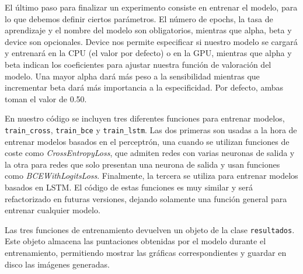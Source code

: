 
El último paso para finalizar un experimento consiste en entrenar el modelo, para lo que debemos definir ciertos parámetros. El número de epochs, la tasa de aprendizaje y el nombre del modelo son obligatorios, mientras que alpha, beta y device son opcionales. Device nos permite especificar si nuestro modelo se cargará y entrenará en la CPU (el valor por defecto) o en la GPU, mientras que alpha y beta indican los coeficientes para ajustar nuestra función de valoración del modelo. Una mayor alpha dará más peso a la sensibilidad mientras que incrementar beta dará más importancia a la especificidad. Por defecto, ambas toman el valor de 0.50.


En nuestro código se incluyen tres diferentes funciones para entrenar modelos, \texttt{train\_cross}, \texttt{train\_bce} y \texttt{train\_lstm}. Las dos primeras son usadas a la hora de entrenar modelos basados en el perceptrón, una cuando se utilizan funciones de coste como \textit{CrossEntropyLoss}, que admiten redes con varias neuronas de salida y la otra para redes que solo presentan una neurona de salida y usan funciones como \textit{BCEWithLogitsLoss}. Finalmente, la tercera se utiliza para entrenar modelos basados en LSTM. El código de estas funciones es muy similar y será refactorizado en futuras versiones, dejando solamente una función general para entrenar cualquier modelo.

Las tres funciones de entrenamiento devuelven un objeto de la clase \texttt{resultados}. Este objeto almacena las puntaciones obtenidas por el modelo durante el entrenamiento, permitiendo mostrar las gráficas correspondientes y guardar en disco las imágenes generadas.

